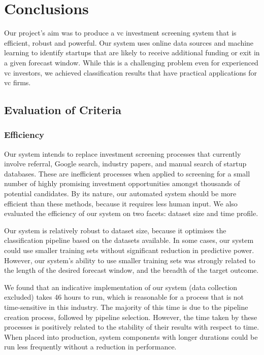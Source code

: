 \documentclass[../thesis/thesis.tex]{subfiles}
\begin{document}
 \chapter{Conclusions}
 \label{chap:conclusions}

Our project's aim was to produce a \gls{vc} investment screening system that is efficient, robust and powerful. Our system uses online data sources and machine learning to identify startups that are likely to receive additional funding or exit in a given forecast window. While this is a challenging problem even for experienced \gls{vc} investors, we achieved classification results that have practical applications for \gls{vc} firms.

\section{Evaluation of Criteria}

\subsection{Efficiency}

Our system intends to replace investment screening processes that currently involve referral, Google search, industry papers, and manual search of startup databases. These are inefficient processes when applied to screening for a small number of highly promising investment opportunities amongst thousands of potential candidates. By its nature, our automated system should be more efficient than these methods, because it requires less human input. We also evaluated the efficiency of our system on two facets: dataset size and time profile. 

Our system is relatively robust to dataset size, because it optimises the classification pipeline based on the datasets available. In some cases, our system could use smaller training sets without significant reduction in predictive power. However, our system's ability to use smaller training sets was strongly related to the length of the desired forecast window, and the breadth of the target outcome. 

We found that an indicative implementation of our system (data collection excluded) takes 46 hours to run, which is reasonable for a process that is not time-sensitive in this industry. The majority of this time is due to the pipeline creation process, followed by pipeline selection. However, the time taken by these processes is positively related to the stability of their results with respect to time. When placed into production, system components with longer durations could be run less frequently without a reduction in performance.
\end{document}
